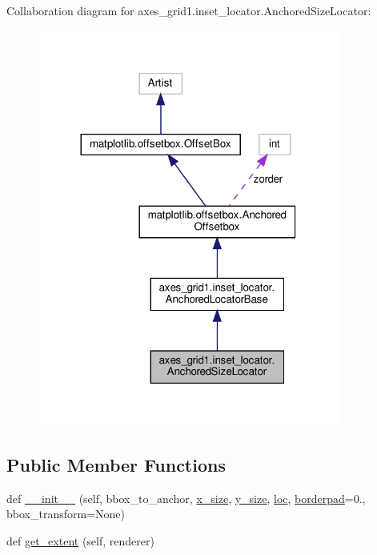 Collaboration diagram for axes\+\_\+grid1.\+inset\+\_\+locator.\+Anchored\+Size\+Locator\+:
\nopagebreak
\begin{figure}[H]
\begin{center}
\leavevmode
\includegraphics[width=281pt]{classaxes__grid1_1_1inset__locator_1_1AnchoredSizeLocator__coll__graph}
\end{center}
\end{figure}
\subsection*{Public Member Functions}
\begin{DoxyCompactItemize}
\item 
def \hyperlink{classaxes__grid1_1_1inset__locator_1_1AnchoredSizeLocator_acddd5729254bf66941df70c1ce90717a}{\+\_\+\+\_\+init\+\_\+\+\_\+} (self, bbox\+\_\+to\+\_\+anchor, \hyperlink{classaxes__grid1_1_1inset__locator_1_1AnchoredSizeLocator_a3c85d2dd55cbba8df63c31caa3b44553}{x\+\_\+size}, \hyperlink{classaxes__grid1_1_1inset__locator_1_1AnchoredSizeLocator_a812abebc75bf68d0723b6044b205acec}{y\+\_\+size}, \hyperlink{classmatplotlib_1_1offsetbox_1_1AnchoredOffsetbox_acff8512cc529c0576658d3d3102f68ad}{loc}, \hyperlink{classmatplotlib_1_1offsetbox_1_1AnchoredOffsetbox_a50d24143d0fabb11a481b3d85b62a19a}{borderpad}=0., bbox\+\_\+transform=None)
\item 
def \hyperlink{classaxes__grid1_1_1inset__locator_1_1AnchoredSizeLocator_acc9d6abb42cac3d36d04bbdbca3fdadd}{get\+\_\+extent} (self, renderer)
\end{DoxyCompactItemize}
